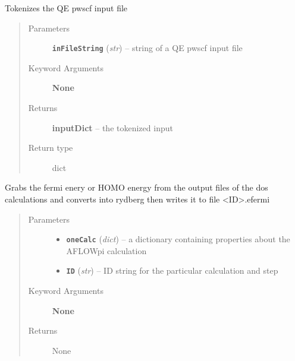 \documentclass[letterpaper,10pt,english]{sphinxmanual}
\begin{document}

\begin{fulllineitems}
\label{retr:retr.__splitInput}
Tokenizes the QE pwscf input file
\begin{quote}\begin{description}
\item[{Parameters}] \leavevmode
\textbf{\texttt{inFileString}} (\emph{str}) -- string of a QE pwscf input file

\item[{Keyword Arguments}] \leavevmode
\textbf{None}

\item[{Returns}] \leavevmode
\textbf{inputDict} --
the tokenized input

\item[{Return type}] \leavevmode
dict

\end{description}\end{quote}

\end{fulllineitems}


\begin{fulllineitems}
\label{retr:retr.__writeEfermi}
Grabs the fermi enery or HOMO energy from the output files of the dos calculations
and converts into rydberg then writes it to file \textless{}ID\textgreater{}.efermi
\begin{quote}\begin{description}
\item[{Parameters}] \leavevmode\begin{itemize}
\item {} 
\textbf{\texttt{oneCalc}} (\emph{dict}) -- a dictionary containing properties about the AFLOWpi calculation

\item {} 
\textbf{\texttt{ID}} (\emph{str}) -- ID string for the particular calculation and step

\end{itemize}

\item[{Keyword Arguments}] \leavevmode
\textbf{None}

\item[{Returns}] \leavevmode
None

\end{description}\end{quote}

\end{fulllineitems}
\end{document}
